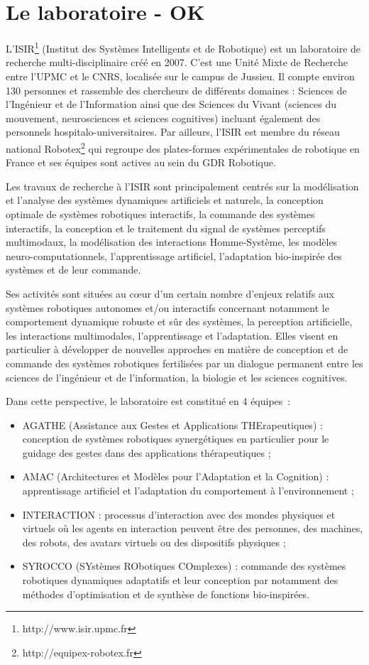 \documentclass[draft]{llncs}
\begin{document}
\section{Le laboratoire - OK}

\lettrine{L}{'ISIR}\footnote{http://www.isir.upmc.fr} (Institut des Systèmes Intelligents et de Robotique) est un laboratoire de recherche multi-disciplinaire créé en 2007.
C'est une Unité Mixte de Recherche entre l'UPMC et le CNRS, localisée sur le campus de Jussieu.
Il compte environ 130 personnes et rassemble des chercheurs de différents domaines : Sciences de l’Ingénieur et de l’Information ainsi que des Sciences du Vivant (sciences du mouvement, neurosciences et sciences cognitives) incluant également des personnels hospitalo-universitaires.
Par ailleurs, l'ISIR est membre du réseau national Robotex\footnote{http://equipex-robotex.fr} qui regroupe des plates-formes expérimentales de robotique en France et ses équipes sont actives au sein du GDR Robotique.

Les travaux de recherche à l'ISIR sont principalement centrés sur la modélisation et l'analyse des systèmes dynamiques artificiels et naturels, la conception optimale de systèmes robotiques interactifs, la commande des systèmes interactifs, la conception et le traitement du signal de systèmes perceptifs multimodaux, la modélisation des interactions Homme-Système, les modèles neuro-computationnels, l'apprentissage artificiel, l'adaptation bio-inspirée des systèmes et de leur commande. 

Ses activités sont situées au cœur d’un certain nombre d’enjeux relatifs aux systèmes robotiques autonomes et/ou interactifs concernant notamment le comportement dynamique robuste et sûr des systèmes, la perception artificielle, les interactions multimodales, l’apprentissage et l’adaptation.
Elles visent en particulier à développer de nouvelles approches en matière de conception et de commande des systèmes robotiques fertilisées par un dialogue permanent entre les sciences de l’ingénieur et de l’information, la biologie et les sciences cognitives.

Dans cette perspective, le laboratoire est constitué en 4 équipes~:

\begin{itemize}
\item AGATHE (Assistance aux Gestes et Applications THErapeutiques) : conception de systèmes robotiques synergétiques en particulier pour le guidage des gestes dans des applications thérapeutiques ;
\item AMAC (Architectures et Modèles pour l'Adaptation et la Cognition) : apprentissage artificiel et l’adaptation du comportement à l’environnement ;
\item INTERACTION : processus d’interaction avec des mondes physiques et virtuels où les agents en interaction peuvent être des personnes, des machines, des robots, des avatars virtuels ou des dispositifs physiques ;
\item SYROCCO (SYstèmes RObotiques COmplexes) : commande des systèmes robotiques dynamiques adaptatifs et leur conception par notamment des méthodes d’optimisation et de synthèse de fonctions bio-inspirées.
\end{itemize}
\end{document}
